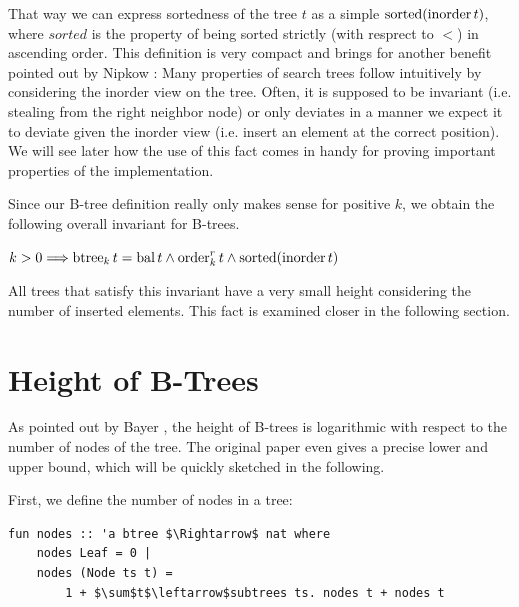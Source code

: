 That way we can express sortedness of the tree $t$ as a simple $\operatorname{sorted} (\operatorname{inorder} t)$,
where $sorted$ is the property of being sorted strictly (with resprect to $<$)
in ascending order.
This definition is very compact and brings for another benefit
pointed out by Nipkow \parencite{DBLP:conf/itp/Nipkow16}:
Many properties of search trees follow intuitively by considering
the inorder view on the tree.
Often, it is supposed to be invariant (i.e. stealing from the right neighbor node)
or only deviates in a manner we expect it to deviate given the inorder view
(i.e. insert an element at the correct position).
We will see later how the use of this fact comes in handy for proving
important properties of the implementation.

Since our B-tree definition really only makes sense for positive $k$,
we obtain the following overall invariant for B-trees.

\begin{definition}
    $k > 0 \Longrightarrow \operatorname{btree}_k t = \operatorname{bal} t \wedge \operatorname{order}^r_k t \wedge \operatorname{sorted} (\operatorname{inorder} t)$
\end{definition}

All trees that satisfy this invariant have a very small
height considering the number of inserted elements.
This fact is examined closer in the following section.

\section{Height of B-Trees}

As pointed out by Bayer \parencite{DBLP:journals/acta/BayerM72},
the height of B-trees is logarithmic with respect to the number
of nodes of the tree.
The original paper even gives a precise lower and upper bound,
which will be quickly sketched in the following.

First, we define the number of nodes in a tree:
\begin{lstlisting}[mathescape=true, language=Isabelle]
fun nodes :: 'a btree $\Rightarrow$ nat where
    nodes Leaf = 0 |
    nodes (Node ts t) =
        1 + $\sum$t$\leftarrow$subtrees ts. nodes t + nodes t
\end{lstlisting}


